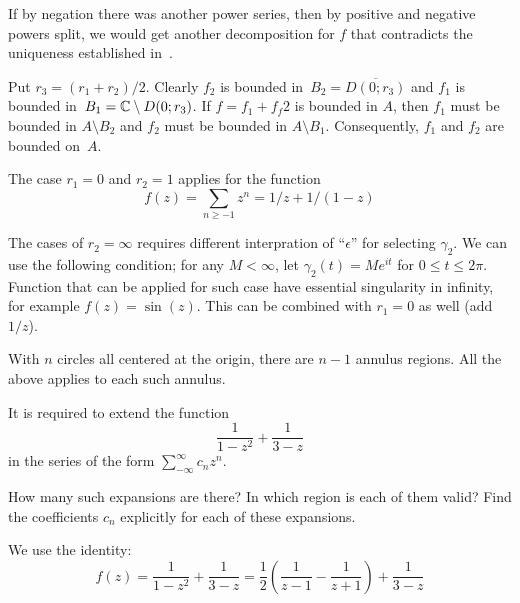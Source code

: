 \begin{enumerate}
\begin{itemize}
If by negation there was another power series, 
then by  positive and negative powers split, we would get 
another decomposition for $f$ that contradicts the uniqueness established 
in~.

Put \(r_3 = (r_1+r_2)/2\). 
Clearly \(f_2\) is bounded in~\(B_2 = \overline{D(0;r_3)}\)
and  \(f_1\) is bounded in~\(B_1 = \mathbb{C}\setminus D(0;r_3)\).
If \(f = f_1+f_f2\) is bounded in $A$, then 
\(f_1\) must be bounded in \(A\setminus B_2\) and
\(f_2\) must be bounded in \(A\setminus B_1\).
Consequently, \(f_1\) and \(f_2\) are bounded on~$A$.

The case \(r_1=0\) and \(r_2=1\) applies for the function 
\begin{equation*}
f(z) = \sum_{n\geq -1} z^n = 1/z + 1/(1-z)
\end{equation*}

The cases of \(r_2=\infty\) requires different interpration of ``\(\epsilon\)''
for selecting \(\gamma_2\). We can use the following condition;
for any \(M<\infty\), let \(\gamma_2(t) = Me^{it}\) for \(0\leq t\leq 2\pi\).
Function that can be applied for such case have essential singularity 
in infinity, for example \(f(z) = \sin(z)\).
This can be combined with \(r_1=0\) as well (add \(1/z\)).

With $n$ circles all centered at the origin, there are \(n-1\) annulus regions.
All the above applies to each such annulus.

\end{itemize}

\begin{excopy}
It is required to extend the function 
\begin{equation*}
\frac{1}{1-z^2} + \frac{1}{3-z}
\end{equation*}
in the series of the form \(\sum_{-\infty}^\infty c_n z^n\).

How many such expansions are there?
In which region is each of them valid?
Find the coefficients \(c_n\) explicitly for each of these expansions.
\end{excopy}

We use the identity:
\begin{equation*}
f(z) = \frac{1}{1-z^2} + \frac{1}{3-z}
= \frac{1}{2}\left(\frac{1}{z-1} - \frac{1}{z+1}\right) + \frac{1}{3-z}
\end{equation*}


\end{enumerate}
